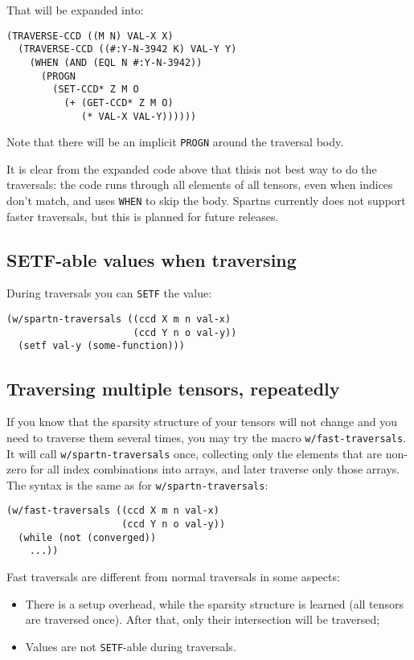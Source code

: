 \documentclass{article}
\begin{document}
That will be expanded into:

\begin{lstlisting}
(TRAVERSE-CCD ((M N) VAL-X X)
  (TRAVERSE-CCD ((#:Y-N-3942 K) VAL-Y Y)
    (WHEN (AND (EQL N #:Y-N-3942))
      (PROGN
        (SET-CCD* Z M O
          (+ (GET-CCD* Z M O)
             (* VAL-X VAL-Y))))))
\end{lstlisting}

Note that there will be an implicit \verb+PROGN+ around the traversal body.

It is clear from the expanded code above that thisis not best way to do the traversals: the code
runs through all elements of all tensors, even when indices don't match, and uses \verb+WHEN+
to skip the body. Spartns currently does not support faster traversals, but this is planned for
future releases.

\subsection{SETF-able values when traversing}

During traversals you can \verb+SETF+ the value:

\begin{lstlisting}
(w/spartn-traversals ((ccd X m n val-x)
                      (ccd Y n o val-y))
  (setf val-y (some-function)))
\end{lstlisting}


\subsection{Traversing multiple tensors, repeatedly}

If you know that the sparsity structure of your tensors will not change and you need to
traverse them several times, you may try the macro \verb+w/fast-traversals+.
It will call \verb+w/spartn-traversals+ once, collecting only the elements that are non-zero
for all index combinations into arrays, and later traverse only those arrays.
The syntax is the same as for \verb+w/spartn-traversals+:

\begin{lstlisting}
(w/fast-traversals ((ccd X m n val-x)
                    (ccd Y n o val-y))
  (while (not (converged))
    ...))
\end{lstlisting}

Fast traversals are different from normal traversals in some aspects:

\begin{itemize}
\item There is a setup overhead, while the sparsity structure is
      learned (all tensors are traversed once). After that, only
      their intersection will be traversed;
\item Values are not \verb+SETF+-able during traversals.
\end{itemize}
\end{document}
